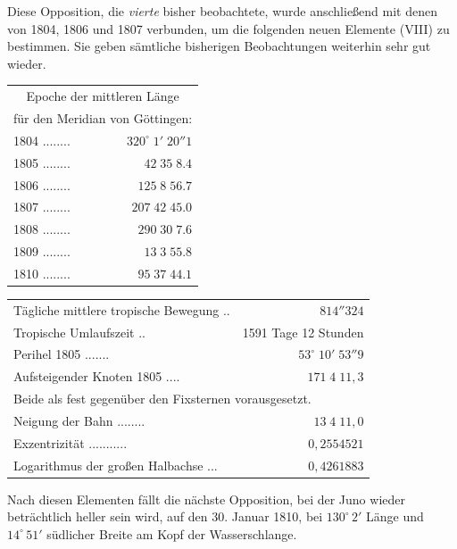 \par\indent Diese Opposition, die \emph{vierte} bisher beobachtete, wurde anschließend mit denen von 1804, 1806 und 1807 verbunden, um die folgenden neuen Elemente (VIII) zu bestimmen. Sie geben sämtliche bisherigen Beobachtungen weiterhin sehr gut wieder.


\begin{center}\fontsize{10}{12}\selectfont\setlength{\tabcolsep}{3pt}\renewcommand{\arraystretch}{1.15}\begin{tabular}{lr}
\multicolumn{2}{c}{Epoche der mittleren Länge}\\
\multicolumn{2}{c}{für den Meridian von Göttingen:}\\\hline
1804 .\;.\;.\;.\;.\;.\;.\;.\; & $320^\circ\;1'\;20''1$\\
1805 .\;.\;.\;.\;.\;.\;.\;.\; & $42\;35\;8.4$\\
1806 .\;.\;.\;.\;.\;.\;.\;.\; & $125\;8\;56.7$\\
1807 .\;.\;.\;.\;.\;.\;.\;.\; & $207\;42\;45.0$\\
1808 .\;.\;.\;.\;.\;.\;.\;.\; & $290\;30\;7.6$\\
1809 .\;.\;.\;.\;.\;.\;.\;.\; & $13\;3\;55.8$\\
1810 .\;.\;.\;.\;.\;.\;.\;.\; & $95\;37\;44.1$\\
\end{tabular}\end{center}

\begin{center}\fontsize{9}{11}\selectfont\setlength{\tabcolsep}{3pt}\renewcommand{\arraystretch}{1.15}\begin{tabular}{lr}
Tägliche mittlere tropische Bewegung .\;.\; & $814''324$\\
Tropische Umlaufszeit .\;.\; & 1591 Tage 12 Stunden\\
Perihel 1805 .\;.\;.\;.\;.\;.\;.\; & $53^\circ\;10'\;53''9$\\
Aufsteigender Knoten 1805 .\;.\;.\;.\; & $171\;4\;11{,}3$\\
\multicolumn{2}{l}{\quad Beide als fest gegenüber den Fixsternen vorausgesetzt.}\\
Neigung der Bahn .\;.\;.\;.\;.\;.\;.\;.\; & $13\;4\;11{,}0$\\
Exzentrizität .\;.\;.\;.\;.\;.\;.\;.\;.\;.\;.\; & $0{,}2554521$\\
Logarithmus der großen Halbachse .\;.\;.\; & $0{,}4261883$\\
\end{tabular}\end{center}


\par\indent Nach diesen Elementen fällt die nächste Opposition, bei der Juno wieder beträchtlich heller sein wird, auf den 30. Januar 1810, bei $130^\circ\,2'$ Länge und $14^\circ\,51'$ südlicher Breite am Kopf der Wasserschlange.

